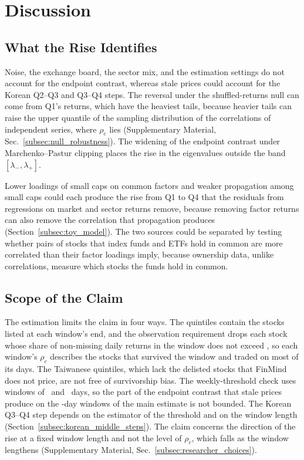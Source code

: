 \documentclass[a4paper,fleqn]{cas-sc}
\begin{document}
\section{Discussion}\label{sec:discussion}

\subsection{What the Rise Identifies}\label{subsec:dissipation_mechanism}

Noise, the exchange board, the sector mix, and the estimation settings do not account for the endpoint contrast, whereas stale prices could account for the Korean Q2--Q3 and Q3--Q4 steps. The reversal under the shuffled-returns null can come from Q1's returns, which have the heaviest tails, because heavier tails can raise the upper quantile of the sampling distribution of the correlations of independent series, where $\rho_c$ lies (Supplementary Material, Sec.~\ref{subsec:null_robustness}). The widening of the endpoint contrast under Marchenko--Pastur clipping places the rise in the eigenvalues outside the band $[\lambda_-, \lambda_+]$.

Lower loadings of small caps on common factors and weaker propagation among small caps could each produce the rise from Q1 to Q4 that the residuals from regressions on market and sector returns remove, because removing factor returns can also remove the correlation that propagation produces (Section~\ref{subsec:toy_model}). The two sources could be separated by testing whether pairs of stocks that index funds and ETFs hold in common are more correlated than their factor loadings imply, because ownership data, unlike correlations, measure which stocks the funds hold in common.

\subsection{Scope of the Claim}\label{subsec:limits}

The estimation limits the claim in four ways. The quintiles contain the stocks listed at each window's end, and the observation requirement drops each stock whose share of non-missing daily returns in the window does not exceed \minValidFractionPct, so each window's $\rho_c$ describes the stocks that survived the window and traded on most of its days. The Taiwanese quintiles, which lack the delisted stocks that FinMind does not price, are not free of survivorship bias. The weekly-threshold check uses windows of \wkWindowShort\ and \wkWindowLong\ days, so the part of the endpoint contrast that stale prices produce on the \paperWindowDays-day windows of the main estimate is not bounded. The Korean Q3--Q4 step depends on the estimator of the threshold and on the window length (Section~\ref{subsec:korean_middle_steps}). The claim concerns the direction of the rise at a fixed window length and not the level of $\rho_c$, which falls as the window lengthens (Supplementary Material, Sec.~\ref{subsec:researcher_choices}).
\end{document}

